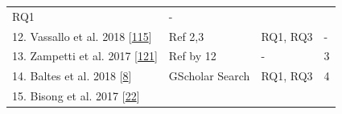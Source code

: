 \documentclass[]{book}
\begin{document}
\begin{longtable}[]{@{}llll@{}}
\begin{minipage}[t]{0.08\columnwidth}
RQ1\strut
\end{minipage} & \begin{minipage}[t]{0.06\columnwidth}\raggedright\strut
-\strut
\end{minipage}\tabularnewline
\begin{minipage}[t]{0.56\columnwidth}\raggedright\strut
12. Vassallo et al. 2018
{[}\protect\hyperlink{ref-vassallo2018break}{115}{]}\strut
\end{minipage} & \begin{minipage}[t]{0.18\columnwidth}\raggedright\strut
Ref 2,3\strut
\end{minipage} & \begin{minipage}[t]{0.08\columnwidth}\raggedright\strut
RQ1, RQ3\strut
\end{minipage} & \begin{minipage}[t]{0.06\columnwidth}\raggedright\strut
-\strut
\end{minipage}\tabularnewline
\begin{minipage}[t]{0.56\columnwidth}\raggedright\strut
13. Zampetti et al. 2017
{[}\protect\hyperlink{ref-zampetti2017open}{121}{]}\strut
\end{minipage} & \begin{minipage}[t]{0.18\columnwidth}\raggedright\strut
Ref by 12\strut
\end{minipage} & \begin{minipage}[t]{0.08\columnwidth}\raggedright\strut
-\strut
\end{minipage} & \begin{minipage}[t]{0.06\columnwidth}\raggedright\strut
3\strut
\end{minipage}\tabularnewline
\begin{minipage}[t]{0.56\columnwidth}\raggedright\strut
14. Baltes et al. 2018
{[}\protect\hyperlink{ref-baltes2018no}{8}{]}\strut
\end{minipage} & \begin{minipage}[t]{0.18\columnwidth}\raggedright\strut
GScholar Search\strut
\end{minipage} & \begin{minipage}[t]{0.08\columnwidth}\raggedright\strut
RQ1, RQ3\strut
\end{minipage} & \begin{minipage}[t]{0.06\columnwidth}\raggedright\strut
4\strut
\end{minipage}\tabularnewline
\begin{minipage}[t]{0.56\columnwidth}\raggedright\strut
15. Bisong et al. 2017
{[}\protect\hyperlink{ref-bisong2017built}{22}{]}\strut

\end{minipage}
\end{longtable}
\end{document}
